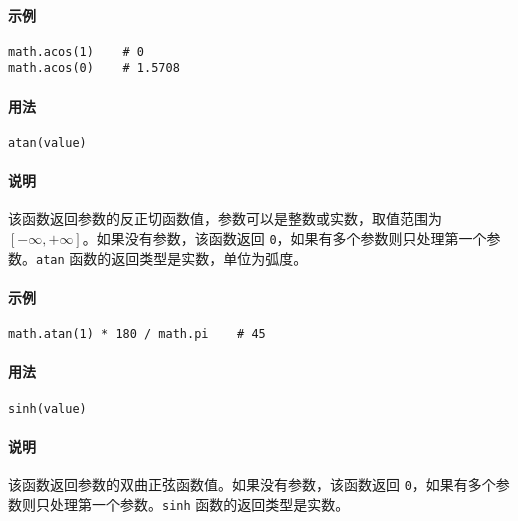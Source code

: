 \paragraph{示例}
\begin{lstlisting}[language=berry, numbers=none]
math.acos(1)    # 0
math.acos(0)    # 1.5708
\end{lstlisting}


\paragraph{用法}
\begin{lstlisting}[language=berry, numbers=none]
atan(value)
\end{lstlisting}

\paragraph{说明}
该函数返回参数的反正切函数值，参数可以是整数或实数，取值范围为 $[-\infty,+\infty]$。如果没有参数，该函数返回 \texttt{0}，如果有多个参数则只处理第一个参数。\texttt{atan} 函数的返回类型是实数，单位为弧度。

\paragraph{示例}
\begin{lstlisting}[language=berry, numbers=none]
math.atan(1) * 180 / math.pi    # 45
\end{lstlisting}


\paragraph{用法}
\begin{lstlisting}[language=berry, numbers=none]
sinh(value)
\end{lstlisting}

\paragraph{说明}
该函数返回参数的双曲正弦函数值。如果没有参数，该函数返回 \texttt{0}，如果有多个参数则只处理第一个参数。\texttt{sinh} 函数的返回类型是实数。

